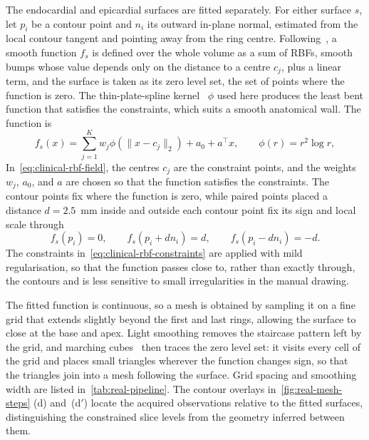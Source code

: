 The endocardial and epicardial surfaces are fitted separately. For either
surface $s$, let $p_i$ be a contour point and $n_i$ its outward in-plane
normal, estimated from the local contour tangent and pointing away from the
ring centre. Following~\textcite{carr2001rbf}, a smooth function $f_s$ is
defined over the whole volume as a sum of RBFs,
smooth bumps whose value depends only on the distance to a centre $c_j$, plus
a linear term, and the surface is taken as its zero level set, the set of
points where the function is zero. The thin-plate-spline
kernel~\parencite{bookstein1989tps} $\phi$ used here produces the least bent
function that satisfies the constraints, which
suits a smooth anatomical wall. The function is
\begin{equation}
	f_s(x) = \sum_{j=1}^{K} w_j\phi(\lVert x-c_j\rVert_2)
	+ a_0 + a^\top x,
	\qquad \phi(r)=r^2\log r,
	\label{eq:clinical-rbf-field}
\end{equation}
In~\cref{eq:clinical-rbf-field}, the centres $c_j$ are the constraint points,
and the weights $w_j$, $a_0$, and $a$ are chosen so that the function satisfies
the constraints. The contour points fix where the function is zero, while
paired points placed a distance $d=2.5$~mm inside and outside each contour
point fix its sign and local scale through
\begin{equation}
	f_s(p_i)=0,
	\qquad f_s(p_i+d n_i)=d,
	\qquad f_s(p_i-d n_i)=-d.
	\label{eq:clinical-rbf-constraints}
\end{equation}
The constraints in~\cref{eq:clinical-rbf-constraints} are applied with mild
regularisation, so that the function passes close to, rather than exactly
through, the contours and is less sensitive to small irregularities in the
manual drawing.

The fitted function is continuous, so a mesh is obtained by sampling it on a
fine grid that extends slightly beyond the first and last rings, allowing the
surface to close at the base and apex. Light smoothing removes the staircase
pattern left by the grid, and marching
cubes~\parencite{lorensen1987marchingcubes} then traces the zero level set:
it visits every cell of the grid and places small triangles wherever the
function changes sign, so that the triangles join into a mesh following the
surface. Grid spacing and smoothing width are listed
in~\cref{tab:real-pipeline}. The contour overlays
in~\cref{fig:real-mesh-steps} (d) and~(d$'$) locate the acquired observations
relative to the fitted surfaces, distinguishing the constrained slice levels
from the geometry inferred between them.

